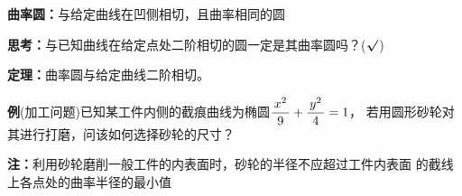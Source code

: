 {\bf 曲率圆：}与给定曲线在凹侧相切，且曲率相同的圆

\begin{center}
\end{center}

{\bf 思考：}与已知曲线在给定点处二阶相切的圆一定是其曲率圆吗？(${\bm{\surd}}$)

{\bf 定理：}曲率圆与给定曲线二阶相切。

{\bf 例}(加工问题)已知某工件内侧的截痕曲线为椭圆$\displaystyle\frac{\,{x^2}\,}{\,{9}\,}+\displaystyle\frac{\,{y^2}\,}{\,{4}\,}=1$，
若用圆形砂轮对其进行打磨，问该如何选择砂轮的尺寸？

\begin{center}
\end{center}

{\bf 注：}利用砂轮磨削一般工件的内表面时，砂轮的半径不应超过工件内表面
的截线上各点处的曲率半径的最小值

